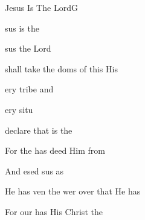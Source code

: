 \begin{song}{Jesus Is The Lord}{G}
  {}
  {}
  {}
  {\NotCCLIed}

  \renewcommand{\RevDate}{February~11,~1993}

  \begin{SBOpGroup}
    sus is the 
    
    sus the Lord 
    
     shall take the doms of this   His  
    
    ery tribe and 
    
    ery situ
    
     declare that  is the  
  \end{SBOpGroup}

  \begin{SBChorus}
    For the    has deed Him from 

    And esed sus as  

    He has ven  the wer over  that He has 

    For our  has  His Christ the 
  \end{SBChorus}
\end{song}


